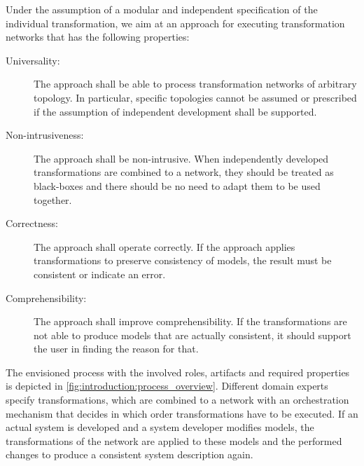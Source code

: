 Under the assumption of a modular and independent specification of the individual transformation, we aim at an approach for executing transformation networks that has the following properties:
\begin{description}
    \item[Universality:] The approach shall be able to process transformation networks of arbitrary topology. In particular, specific topologies cannot be assumed or prescribed if the assumption of independent development shall be supported.
    \item[Non-intrusiveness:] The approach shall be non-intrusive. When independently developed transformations are combined to a network, they should be treated as black-boxes and there should be no need to adapt them to be used together.
    \item[Correctness:] The approach shall operate correctly. If the approach applies transformations to preserve consistency of models, the result must be consistent or indicate an error.
    \item[Comprehensibility:] The approach shall improve comprehensibility. If the transformations are not able to produce models that are actually consistent, it should support the user in finding the reason for that.
\end{description}
The envisioned process with the involved roles, artifacts and required properties is depicted in \autoref{fig:introduction:process_overview}.
Different domain experts specify transformations, which are combined to a network with an orchestration mechanism that decides in which order transformations have to be executed. If an actual system is developed and a system developer modifies models, the transformations of the network are applied to these models and the performed changes to produce a consistent system description again.

